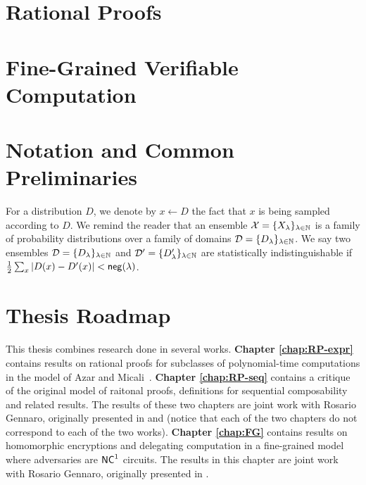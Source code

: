 \section{Rational Proofs}




\section{Fine-Grained Verifiable Computation}



\section{Notation and Common Preliminaries}

For a distribution $D$, we denote by $x \gets D$ the fact that $x$ is being sampled according to $D$.
We remind the reader that an ensemble $\mathcal{X} = \{X_{\lambda}\}_{\lambda\in\mathbb{N}}$ is a family of  probability distributions over a family of domains $\mathcal{D}=\{D_{\lambda}\}_{\lambda\in\mathbb{N}}$. We say two ensembles $\mathcal{D} = \{D_{\lambda}\}_{\lambda\in\mathbb{N}}$ and $\mathcal{D}' = \{D'_{\lambda}\}_{\lambda\in\mathbb{N}}$ are statistically indistinguishable if $\frac{1}{2}\sum_x |D(x)-D'(x)| < \mathsf{neg}(\lambda)$. 


\section{Thesis Roadmap} 
This thesis combines research done in several works.
\textbf{Chapter \ref{chap:RP-expr}} contains results on rational proofs for subclasses of polynomial-time computations in the model of Azar and Micali~\cite{am}. 
\textbf{Chapter \ref{chap:RP-seq}} contains a critique of the original model of raitonal proofs, definitions for sequential composability and related results. The results of these two chapters are joint work with Rosario Gennaro, originally presented in \cite{cg15} and \cite{cg17} (notice that each of the two chapters do not correspond to each of the two works).
\textbf{Chapter \ref{chap:FG}} contains results on homomorphic encryptions and delegating computation in a fine-grained model where adversaries are ${\mathsf{NC}}^1$ circuits.
 The results in this chapter are joint work with Rosario Gennaro, originally presented in \cite{cg18}.


